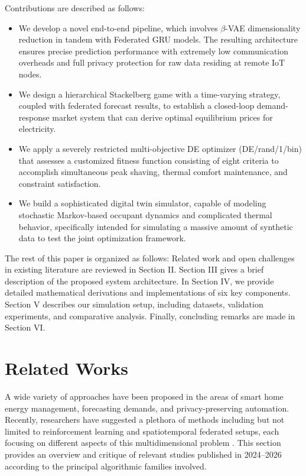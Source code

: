 \documentclass[journal]{IEEEtran}
\begin{document}
Contributions are described as follows:

\begin{itemize}
    \item We develop a novel end-to-end pipeline, which involves $\beta$-VAE dimensionality reduction in tandem with Federated GRU models. The resulting architecture ensures precise prediction performance with extremely low communication overheads and full privacy protection for raw data residing at remote IoT nodes.

    \item We design a hierarchical Stackelberg game with a time-varying strategy, coupled with federated forecast results, to establish a closed-loop demand-response market system that can derive optimal equilibrium prices for electricity.

    \item We apply a severely restricted multi-objective DE optimizer (DE/rand/1/bin) that assesses a customized fitness function consisting of eight criteria to accomplish simultaneous peak shaving, thermal comfort maintenance, and constraint satisfaction.

    \item We build a sophisticated digital twin simulator, capable of modeling stochastic Markov-based occupant dynamics and complicated thermal behavior, specifically intended for simulating a massive amount of synthetic data to test the joint optimization framework.
\end{itemize}

The rest of this paper is organized as follows: Related work and open challenges in existing literature are reviewed in Section II. Section III gives a brief description of the proposed system architecture. In Section IV, we provide detailed mathematical derivations and implementations of six key components. Section V describes our simulation setup, including datasets, validation experiments, and comparative analysis. Finally, concluding remarks are made in Section VI.

\section{Related Works}

A wide variety of approaches have been proposed in the areas of smart home energy management, forecasting demands, and privacy-preserving automation. Recently, researchers have suggested a plethora of methods including but not limited to reinforcement learning and spatiotemporal federated setups, each focusing on different aspects of this multidimensional problem \cite{rahman2025electrical, zhang2025adaptive}. This section provides an overview and critique of relevant studies published in 2024--2026 according to the principal algorithmic families involved.
\end{document}
